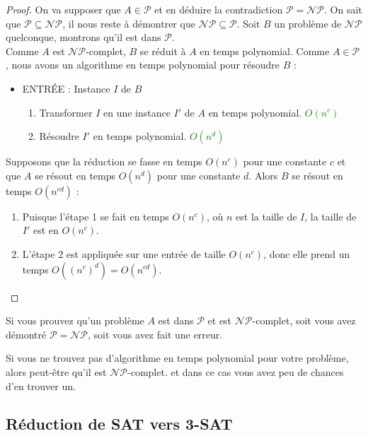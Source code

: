 \begin{proof}
    On va supposer que $A\in\mathcal{P}$ et en déduire la contradiction $\mathcal{P}=\mathcal{NP}$. On sait que $\mathcal{P}
    \subseteq\mathcal{NP}$, il nous reste à démontrer que $\mathcal{NP}\subseteq\mathcal{P}$. Soit $B$ un problème de 
    $\mathcal{NP}$ quelconque, montrons qu'il est dans $\mathcal{P}$. \\
    Comme $A$ est $\mathcal{NP}$-complet, $B$ se réduit à $A$ en temps polynomial. Comme $A\in\mathcal{P}$, nous avons un 
    algorithme en temps polynomial pour résoudre $B$ :
    \begin{itemize}[label=\textbullet]
        \item ENTRÉE : Instance $I$ de $B$
        \begin{enumerate}
            \item Transformer $I$ en une instance $I'$ de $A$ en temps polynomial. \textcolor{green}{$O(n^c)$}
            \item Résoudre $I'$ en temps polynomial. \textcolor{green}{$O(n^d)$}
        \end{enumerate}
    \end{itemize}
    Supposons que la réduction se fasse en temps $O(n^c)$ pour une constante $c$ et que $A$ se résout en temps $O(n^d)$ pour
    une constante $d$. Alors $B$ se résout en temps $O(n^{cd})$ :
    \begin{enumerate}
        \item Puisque l'étape 1 se fait en temps $O(n^c)$, où $n$ est la taille de $I$, la taille de $I'$ est en $O(n^c)$.
        \item L'étape 2 est appliquée sur une entrée de taille $O(n^c)$, donc elle prend un temps $O((n^c)^d) = O(n^{cd})$.
    \end{enumerate}
\end{proof}
\begin{lemma}{}{}
    Si vous prouvez qu'un problème $A$ est dans $\mathcal{P}$ et est $\mathcal{NP}$-complet, soit vous avez démontré 
    $\mathcal{P}=\mathcal{NP}$, soit vous avez fait une erreur.
\end{lemma}
\begin{lemma}{}{}
    Si vous ne trouvez pas d'algorithme en temps polynomial pour votre problème, alors peut-être qu'il est $\mathcal{NP}$-complet.
    et dans ce cas vous avez peu de chances d'en trouver un.
\end{lemma}

\subsection{Réduction de SAT vers 3-SAT}